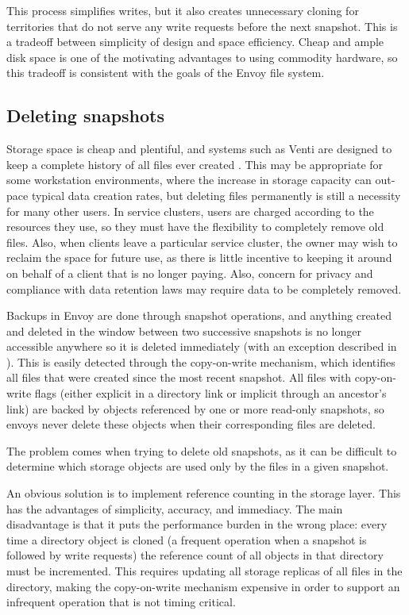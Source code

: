 This process simplifies writes, but it also creates unnecessary cloning for territories that do not serve any write requests before the next snapshot. This is a tradeoff between simplicity of design and space efficiency. Cheap and ample disk space is one of the motivating advantages to using commodity hardware, so this tradeoff is consistent with the goals of the Envoy file system.

\subsection{Deleting snapshots}

Storage space is cheap and plentiful, and systems such as Venti are designed to keep a complete history of all files ever created \cite{quinlan}. This may be appropriate for some workstation environments, where the increase in storage capacity can out-pace typical data creation rates, but deleting files permanently is still a necessity for many other users. In service clusters, users are charged according to the resources they use, so they must have the flexibility to completely remove old files. Also, when clients leave a particular service cluster, the owner may wish to reclaim the space for future use, as there is little incentive to keeping it around on behalf of a client that is no longer paying. Also, concern for privacy and compliance with data retention laws may require data to be completely removed.

Backups in Envoy are done through snapshot operations, and anything created and deleted in the window between two successive snapshots is no longer accessible anywhere so it is deleted immediately (with an exception described in ). This is easily detected through the copy-on-write mechanism, which identifies all files that were created since the most recent snapshot. All files with copy-on-write flags (either explicit in a directory link or implicit through an ancestor's link) are backed by objects referenced by one or more read-only snapshots, so envoys never delete these objects when their corresponding files are deleted.

The problem comes when trying to delete old snapshots, as it can be difficult to determine which storage objects are used only by the files in a given snapshot.

An obvious solution is to implement reference counting in the storage layer. This has the advantages of simplicity, accuracy, and immediacy. The main disadvantage is that it puts the performance burden in the wrong place: every time a directory object is cloned (a frequent operation when a snapshot is followed by write requests) the reference count of all objects in that directory must be incremented. This requires updating all storage replicas of all files in the directory, making the copy-on-write mechanism expensive in order to support an infrequent operation that is not timing critical.

